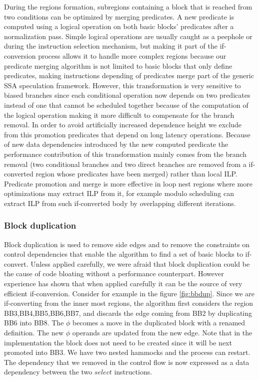 During the regions formation, subregions containing a block that is reached from two conditions can be optimized by merging predicates. A new predicate is computed using a logical operation on both basic blocks' predicates after a normalization pass. Simple logical operations are usually caught as a peephole or during the instruction selection mechanism, but making it part of the if-conversion process allows it to handle more complex regions because our predicate merging algorithm is not limited to basic blocks that only define predicates, making instructions depending of predicates merge part of the generic SSA speculation framework. However, this transformation is very sensitive to biased branches since each conditional operation now depends on two predicates instead of one that cannot be scheduled together because of the computation of the logical operation making it more difficult to compensate for the branch removal. In order to avoid artificially increased dependence height we exclude from this promotion predicates that depend on long latency operations.
Because of new data dependencies introduced by the new computed predicate the performance contribution of this transformation mainly comes from the branch removal (two conditional branches and two direct branches are removed from a if-converted region whose predicates have been merged) rather than local ILP. Predicate promotion and merge is more effective in loop nest regions where more optimizations may extract ILP from it, for example modulo scheduling can extract ILP from such if-converted body by overlapping different iterations. 

\subsubsection{Block duplication}

Block duplication is used to remove side edges and to remove the constraints on control dependencies that enable the algorithm to find a set of basic blocks to if-convert. Unless applied carefully, we were afraid that block duplication could be the cause of code bloating without a performance counterpart. However experience has shown that when applied carefully it can be the source of very efficient if-conversion. Consider for example in the figure \ref{fig:bbdup}. Since we are if-converting from the inner most regions, the algorithm first considers the region {BB3,BB4,BB5,BB6,BB7}, and discards the edge coming from BB2 by duplicating BB6 into BB8. The $\phi$ becomes a move in the duplicated block with a renamed definition. The new $\phi$ operands are updated from the new edge. Note that in the implementation the block does not need to be created since it will be next promoted into BB3. We have two nested hammocks and the process can restart. The dependency that we removed in the control flow is now expressed as a data dependency between the two $select$ instructions.

